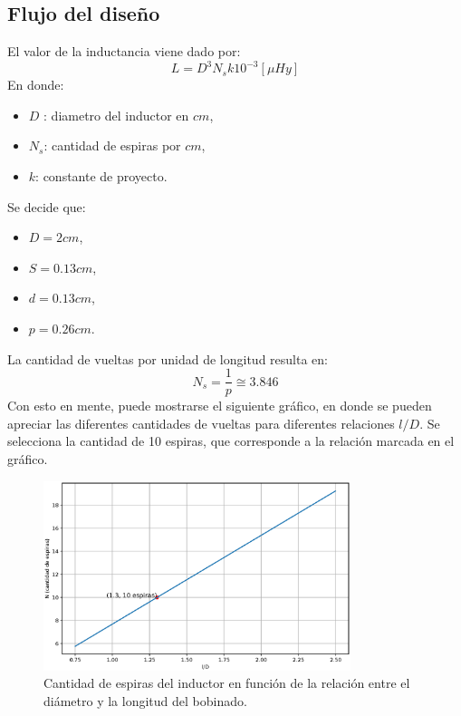 \documentclass{article}
\begin{document}
\subsection{Flujo del diseño}
El valor de la inductancia viene dado por:
\begin{equation*}
    L = D^3N_sk10^{-3} [\mu Hy]
\end{equation*}
\noindent En donde:
\begin{itemize}
    \item $D$ : diametro del inductor en $cm$,
    \item $N_s$: cantidad de espiras por $cm$,
    \item $k$: constante de proyecto.
\end{itemize}
\noindent Se decide que:
\begin{itemize}
    \item $D = 2 cm$,
    \item $S = 0.13 cm$,
    \item $d = 0.13 cm$,
    \item $p = 0.26 cm$.
\end{itemize}
\noindent La cantidad de vueltas por unidad de longitud resulta en:
\begin{equation*}
    N_s = \frac{1}{p} \cong 3.846 
\end{equation*}
\noindent Con esto en mente, puede mostrarse el siguiente gráfico, en donde se pueden apreciar las diferentes cantidades de vueltas para diferentes relaciones $l/D$. Se selecciona la cantidad de 10 espiras, que corresponde a la relación marcada en el gráfico.

\begin{figure}[H]
    \centering
    \includegraphics[width=0.8\textwidth]{./img/figura10.eps}
    \caption{Cantidad de espiras del inductor en función de la relación entre el diámetro y la longitud del bobinado.}
    \label{fig:circuito10}
\end{figure}
\end{document}
